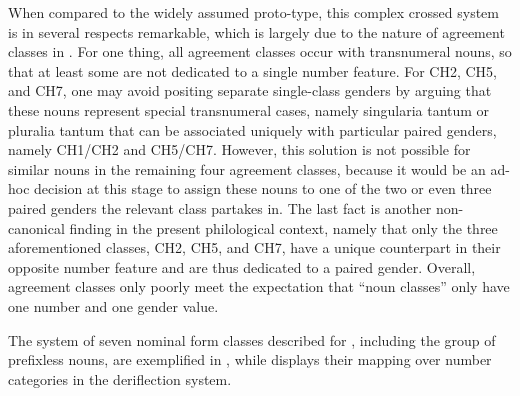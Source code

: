 \documentclass[output=collectionpaper]{langsci/langscibook}
\begin{document}
When compared to the widely assumed  proto-type, this complex crossed system is in several respects remarkable, which is largely due to the nature of agreement classes in . For one thing, all agreement classes occur with transnumeral nouns, so that at least some are not dedicated to a single number feature. For CH2, CH5, and CH7, one may avoid positing separate single-class genders by arguing that these nouns represent special transnumeral cases, namely singularia tantum or pluralia tantum that can be associated uniquely with particular paired genders, namely CH1/CH2 and CH5/CH7. However, this solution is not possible for similar nouns in the remaining four agreement classes, because it would be an ad-hoc decision at this stage to assign these nouns to one of the two or even three paired genders the relevant class partakes in. The last fact is another non-canonical finding in the present philological context, namely that only the three aforementioned classes, CH2, CH5, and CH7, have a unique counterpart in their opposite number feature and are thus dedicated to a paired gender. Overall,  agreement classes only poorly meet the  expectation that ``noun classes'' only have one number and one gender value.

The system of seven nominal form classes described for , including the group of prefixless nouns, are exemplified in , while  displays their mapping over number categories in the deriflection system.
\end{document}
